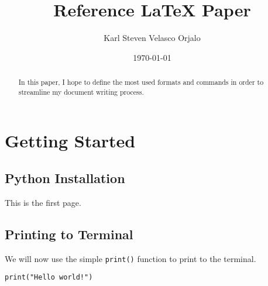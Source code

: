 \documentclass[12pt, letterpaper]{article}
\title{Reference LaTeX Paper}
\author{Karl Steven Velasco Orjalo}
\date{\today}
\begin{document}
\maketitle
\begin{abstract}
  In this paper, I hope to define the most used formats and commands in order to 
  streamline my document writing process.
\end{abstract}
\newpage
\section{Getting Started}
\subsection{Python Installation}
This is the first page.
\subsection{Printing to Terminal}
We will now use the simple \texttt{print()} function to print to the terminal.

\begin{mdframed}[backgroundcolor=bg]
\begin{verbatim}
print("Hello world!")
\end{verbatim}
\end{mdframed}
\end{document}
